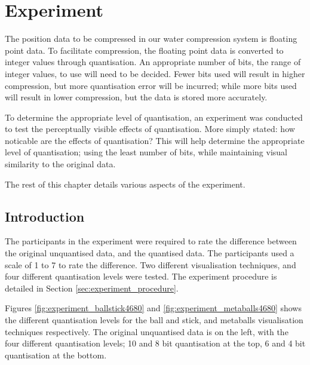 \graphicspath{{./experiment/}}

\chapter{Experiment}
\label{cha:experiment}

The position data to be compressed in our water compression system is floating
point data. To facilitate compression, the floating point data is converted to
integer values through quantisation. An appropriate number of bits, the range
of integer values, to use will need to be decided. Fewer bits used will result
in higher compression, but more quantisation error will be incurred; while more
bits used will result in lower compression, but the data is stored more
accurately.

To determine the appropriate level of quantisation, an experiment was conducted
to test the perceptually visible effects of quantisation. More simply stated:
how noticable are the effects of quantisation? This will help determine the
appropriate level of quantisation; using the least number of bits, while
maintaining visual similarity to the original data.

The rest of this chapter details various aspects of the experiment.

\section{Introduction}
\label{sec:experiment_introduction}

The participants in the experiment were required to rate the difference between
the original unquantised data, and the quantised data. The participants used a
scale of 1 to 7 to rate the difference. Two different visualisation techniques,
and four different quantisation levels were tested. The experiment procedure is
detailed in Section \ref{sec:experiment_procedure}.

Figures \ref{fig:experiment_ballstick4680} and
\ref{fig:experiment_metaballs4680} shows the different quantisation levels for
the ball and stick, and metaballs visualisation techniques respectively. The
original unquantised data is on the left, with the four different quantisation
levels; 10 and 8 bit quantisation at the top, 6 and 4 bit quantisation at the
bottom.

